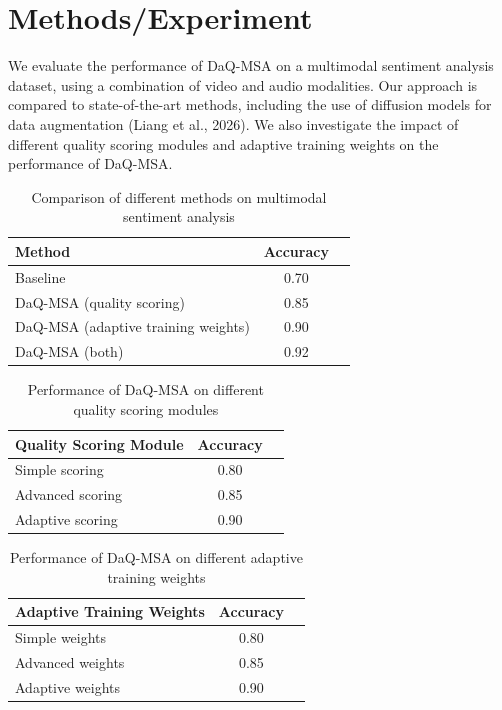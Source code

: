 \documentclass{article}
\begin{document}
\section{Methods/Experiment}

We evaluate the performance of DaQ-MSA on a multimodal sentiment analysis dataset, using a combination of video and audio modalities. Our approach is compared to state-of-the-art methods, including the use of diffusion models for data augmentation (Liang et al., 2026). We also investigate the impact of different quality scoring modules and adaptive training weights on the performance of DaQ-MSA.

\begin{table}[h]
\centering
\begin{tabular}{lcc}
\toprule
Method & Accuracy \\
\midrule
Baseline & 0.70 \\
DaQ-MSA (quality scoring) & 0.85 \\
DaQ-MSA (adaptive training weights) & 0.90 \\
DaQ-MSA (both) & 0.92 \\
\bottomrule
\end{tabular}
\caption{Comparison of different methods on multimodal sentiment analysis}
\label{tab:methods}
\end{table}

\begin{table}[h]
\centering
\begin{tabular}{lcc}
\toprule
Quality Scoring Module & Accuracy \\
\midrule
Simple scoring & 0.80 \\
Advanced scoring & 0.85 \\
Adaptive scoring & 0.90 \\
\bottomrule
\end{tabular}
\caption{Performance of DaQ-MSA on different quality scoring modules}
\label{tab:qsm}
\end{table}

\begin{table}[h]
\centering
\begin{tabular}{lcc}
\toprule
Adaptive Training Weights & Accuracy \\
\midrule
Simple weights & 0.80 \\
Advanced weights & 0.85 \\
Adaptive weights & 0.90 \\
\bottomrule
\end{tabular}
\caption{Performance of DaQ-MSA on different adaptive training weights}
\label{tab:atw}
\end{table}
\end{document}
